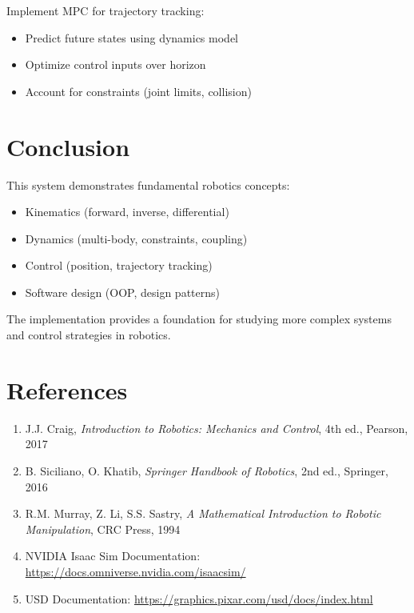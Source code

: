 \documentclass[11pt,a4paper]{article}
\begin{document}
Implement MPC for trajectory tracking:
\begin{itemize}
    \item Predict future states using dynamics model
    \item Optimize control inputs over horizon
    \item Account for constraints (joint limits, collision)
\end{itemize}

\section{Conclusion}

This system demonstrates fundamental robotics concepts:
\begin{itemize}
    \item Kinematics (forward, inverse, differential)
    \item Dynamics (multi-body, constraints, coupling)
    \item Control (position, trajectory tracking)
    \item Software design (OOP, design patterns)
\end{itemize}

The implementation provides a foundation for studying more complex systems and control strategies in robotics.

\section{References}

\begin{enumerate}
    \item J.J. Craig, \textit{Introduction to Robotics: Mechanics and Control}, 4th ed., Pearson, 2017
    \item B. Siciliano, O. Khatib, \textit{Springer Handbook of Robotics}, 2nd ed., Springer, 2016
    \item R.M. Murray, Z. Li, S.S. Sastry, \textit{A Mathematical Introduction to Robotic Manipulation}, CRC Press, 1994
    \item NVIDIA Isaac Sim Documentation: \url{https://docs.omniverse.nvidia.com/isaacsim/}
    \item USD Documentation: \url{https://graphics.pixar.com/usd/docs/index.html}
\end{enumerate}
\end{document}
